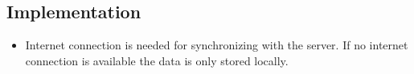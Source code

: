 \subsection*{Implementation}
\begin{itemize}
	\item Internet connection is needed for synchronizing with the server. If no internet connection is available the data is only stored locally.
\end{itemize}